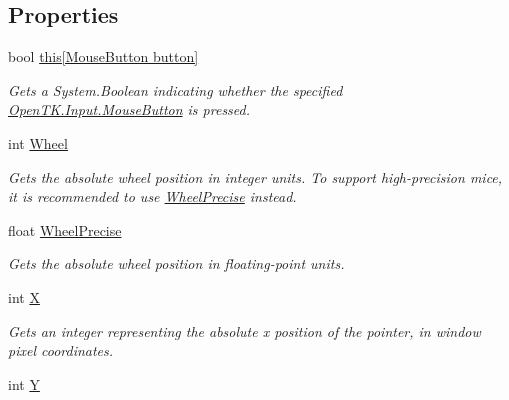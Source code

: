 \subsection*{Properties}
\begin{DoxyCompactItemize}
\item 
bool \hyperlink{struct_open_t_k_1_1_input_1_1_mouse_state_ab17d6377dee4f554214f7872f5f05b61}{this\mbox{[}\-Mouse\-Button button\mbox{]}}
\begin{DoxyCompactList}\small\item\em Gets a System.\-Boolean indicating whether the specified \hyperlink{namespace_open_t_k_1_1_input_a2f6f4de1a952f42570d2e06fd15b5774}{Open\-T\-K.\-Input.\-Mouse\-Button} is pressed. \end{DoxyCompactList}\item 
int \hyperlink{struct_open_t_k_1_1_input_1_1_mouse_state_ab490a682925a6ddd972eb41cab4714d5}{Wheel}
\begin{DoxyCompactList}\small\item\em Gets the absolute wheel position in integer units. To support high-\/precision mice, it is recommended to use \hyperlink{struct_open_t_k_1_1_input_1_1_mouse_state_a7cccb024aeef61d35a151f97e63e9523}{Wheel\-Precise} instead. \end{DoxyCompactList}\item 
float \hyperlink{struct_open_t_k_1_1_input_1_1_mouse_state_a7cccb024aeef61d35a151f97e63e9523}{Wheel\-Precise}
\begin{DoxyCompactList}\small\item\em Gets the absolute wheel position in floating-\/point units. \end{DoxyCompactList}\item 
int \hyperlink{struct_open_t_k_1_1_input_1_1_mouse_state_a6982bc2d2ba1de945958142d3e6cc660}{X}
\begin{DoxyCompactList}\small\item\em Gets an integer representing the absolute x position of the pointer, in window pixel coordinates. \end{DoxyCompactList}\item 
int \hyperlink{struct_open_t_k_1_1_input_1_1_mouse_state_a768bb7145134c4f4c7381e91f4b59744}{Y}

\end{DoxyCompactItemize}
